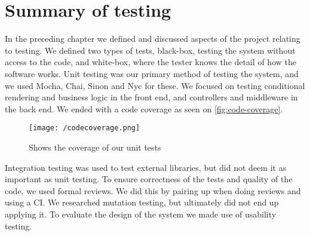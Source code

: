 \section{Summary of testing}
In the preceding chapter we defined and discussed aspects of the project relating to testing.
We defined two types of tests, black-box, testing the system without access to the code, and white-box, where the tester knows the detail of how the software works.
Unit testing was our primary method of testing the system, and we used Mocha, Chai, Sinon and Nyc for these.
We focused on testing conditional rendering and business logic in the front end, and controllers and middleware in the back end.
We ended with a code coverage as seen on \autoref{fig:code-coverage}.
\begin{figure}[]
    \texttt{[image: /codecoverage.png]}
     \caption{Shows the coverage of our unit tests}
     \label{fig:code-coverage}
 \end{figure}
Integration testing was used to test external libraries, but did not deem it as important as unit testing.
To ensure correctness of the tests and quality of the code, we used formal reviews.
We did this by pairing up when doing reviews and using a CI.
We researched mutation testing, but ultimately did not end up applying it.
To evaluate the design of the system we made use of usability testing.
